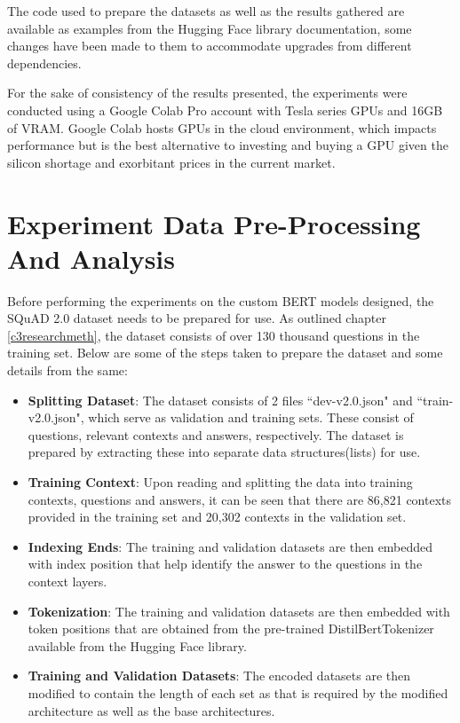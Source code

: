 \documentclass[a4paper,12pt]{report}
\begin{document}
        The code used to prepare the datasets as well as the results gathered are available as examples from the Hugging Face library documentation, some changes have been made to them to accommodate upgrades from different dependencies.

        For the sake of consistency of the results presented, the experiments were conducted using a Google Colab Pro account with Tesla series GPUs and 16GB of VRAM. Google Colab hosts GPUs in the cloud environment, which impacts performance but is the best alternative to investing and buying a GPU given the silicon shortage and exorbitant prices in the current market.

        \section{Experiment Data Pre-Processing And Analysis}

        Before performing the experiments on the custom BERT models designed, the SQuAD 2.0 dataset needs to be prepared for use. As outlined chapter \ref{c3researchmeth}, the dataset consists of over 130 thousand questions in the training set.
        Below are some of the steps taken to prepare the dataset and some details from the same:

        \begin{itemize}
        	\item \textbf{Splitting Dataset}: The dataset consists of 2 files ``dev-v2.0.json" and ``train-v2.0.json", which serve as validation and training sets. These consist of questions, relevant contexts and answers, respectively. The dataset is prepared by extracting these into separate data structures(lists) for use.
        	\item \textbf{Training Context}: Upon reading and splitting the data into training contexts, questions and answers, it can be seen that there are 86,821 contexts provided in the training set and 20,302 contexts in the validation set.
        	\item \textbf{Indexing Ends}: The training and validation datasets are then embedded with index position that help identify the answer to the questions in the context layers.
        	\item \textbf{Tokenization}: The training and validation datasets are then embedded with token positions that are obtained from the pre-trained DistilBertTokenizer available from the Hugging Face library.
        	\item \textbf{Training and Validation Datasets}: The encoded datasets are then modified to contain the length of each set as that is required by the modified architecture as well as the base architectures.
        \end{itemize}
		
\end{document}
